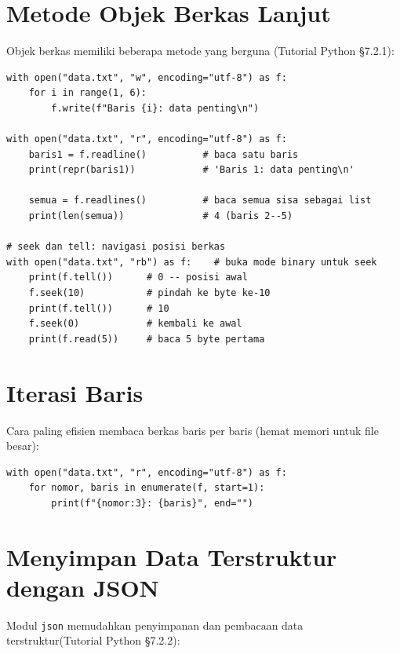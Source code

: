 \documentclass[../main.tex]{subfiles}
\begin{document}
\section{Metode Objek Berkas Lanjut}

Objek berkas memiliki beberapa metode yang berguna (Tutorial Python §7.2.1):

\begin{lstlisting}[caption=Metode berkas: readline readlines seek tell]
with open("data.txt", "w", encoding="utf-8") as f:
    for i in range(1, 6):
        f.write(f"Baris {i}: data penting\n")

with open("data.txt", "r", encoding="utf-8") as f:
    baris1 = f.readline()          # baca satu baris
    print(repr(baris1))            # 'Baris 1: data penting\n'

    semua = f.readlines()          # baca semua sisa sebagai list
    print(len(semua))              # 4 (baris 2--5)

# seek dan tell: navigasi posisi berkas
with open("data.txt", "rb") as f:    # buka mode binary untuk seek
    print(f.tell())      # 0 -- posisi awal
    f.seek(10)           # pindah ke byte ke-10
    print(f.tell())      # 10
    f.seek(0)            # kembali ke awal
    print(f.read(5))     # baca 5 byte pertama
\end{lstlisting}

\section{Iterasi Baris}

Cara paling efisien membaca berkas baris per baris (hemat memori untuk file besar):

\begin{lstlisting}[caption=Iterasi baris -- cara paling efisien]
with open("data.txt", "r", encoding="utf-8") as f:
    for nomor, baris in enumerate(f, start=1):
        print(f"{nomor:3}: {baris}", end="")
\end{lstlisting}

\section{Menyimpan Data Terstruktur dengan JSON}

Modul \texttt{json} memudahkan penyimpanan dan pembacaan data terstruktur\newline (Tutorial Python §7.2.2):
\end{document}
